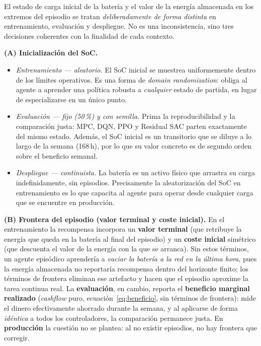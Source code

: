 \documentclass[12pt, a4paper, twoside]{report}
\begin{document}
El estado de carga inicial de la batería y el valor de la energía almacenada en
los extremos del episodio se tratan \emph{deliberadamente de forma distinta} en
entrenamiento, evaluación y despliegue. No es una inconsistencia, sino tres
decisiones coherentes con la finalidad de cada contexto.

\textbf{(A) Inicialización del SoC.}
\begin{itemize}
  \item \emph{Entrenamiento — aleatorio.} El SoC inicial se muestrea
    uniformemente dentro de los límites operativos. Es una forma de
    \textit{domain randomization}: obliga al agente a aprender una política
    robusta a \emph{cualquier} estado de partida, en lugar de especializarse en
    un único punto.
  \item \emph{Evaluación — fijo (50\,\%) y con semilla.} Prima la
    reproducibilidad y la comparación justa: MPC, DQN, PPO y Residual SAC parten
    exactamente del mismo estado. Además, el SoC inicial es un transitorio que se
    diluye a lo largo de la semana (168\,h), por lo que su valor concreto es de
    segundo orden sobre el beneficio semanal.
  \item \emph{Despliegue — continuista.} La batería es un activo físico que
    arrastra su carga indefinidamente, sin episodios. Precisamente la
    aleatorización del SoC en entrenamiento es lo que capacita al agente para
    operar desde cualquier carga que se encuentre en producción.
\end{itemize}

\textbf{(B) Frontera del episodio (valor terminal y coste inicial).} En el
entrenamiento la recompensa incorpora un \textbf{valor terminal} (que retribuye la
energía que queda en la batería al final del episodio) y un \textbf{coste inicial}
simétrico (que descuenta el valor de la energía con la que se arranca). Sin estos
términos, un agente episódico aprendería a \emph{vaciar la batería a la red en la
última hora}, pues la energía almacenada no reportaría recompensa dentro del
horizonte finito; los términos de frontera eliminan ese artefacto y hacen que el
episodio aproxime la tarea continua real. La \textbf{evaluación}, en cambio,
reporta el \textbf{beneficio marginal realizado} (\emph{cashflow} puro,
ecuación~\eqref{eq:beneficio}, sin términos de frontera): mide el dinero
efectivamente ahorrado durante la semana, y al aplicarse de forma \emph{idéntica}
a todos los controladores, la comparación permanece justa. En \textbf{producción}
la cuestión no se plantea: al no existir episodios, no hay frontera que corregir.
\end{document}

